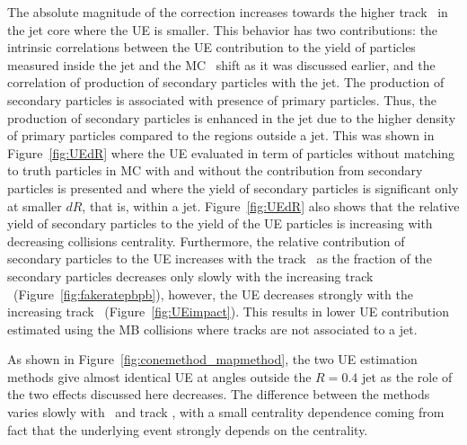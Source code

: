 

The absolute magnitude of the correction increases towards the higher track \pt\ in the jet core where the UE is smaller.
This behavior has two contributions: the intrinsic correlations between the UE contribution to the yield of particles measured inside the jet and the MC \pTjet\ shift as it was discussed earlier, and the correlation of production of secondary particles with the jet.
The production of secondary particles is associated with presence of primary particles.
Thus, the production of secondary particles is enhanced in the jet due to the higher density of primary particles compared to the regions outside a jet.
This was shown in Figure~\ref{fig:UEdR} where the UE evaluated in term of particles without matching to truth particles in MC with and without the contribution from secondary particles is presented and where the yield of secondary particles is significant only at smaller $dR$, that is, within a jet.
Figure~\ref{fig:UEdR} also shows that the relative yield of secondary particles to the yield of the UE particles is increasing with decreasing collisions centrality.
Furthermore, the relative contribution of secondary particles to the UE increases with the track \pT\ as the fraction of the secondary particles decreases only slowly with the increasing track \pT\ (Figure~\ref{fig:fakeratepbpb}), however, the UE decreases strongly with the increasing track \pT\ (Figure~\ref{fig:UEimpact}).
This results in lower UE contribution estimated using the MB collisions where tracks are not associated to a jet.


As shown in Figure~\ref{fig:conemethod_mapmethod}, the two UE estimation methods give almost identical UE at angles outside the $R=0.4$ jet as the role of the two effects discussed here decreases.
The difference between the methods varies slowly with \ptjet\ and track \pT, with a small centrality dependence coming from fact that the underlying event strongly depends on the centrality.

